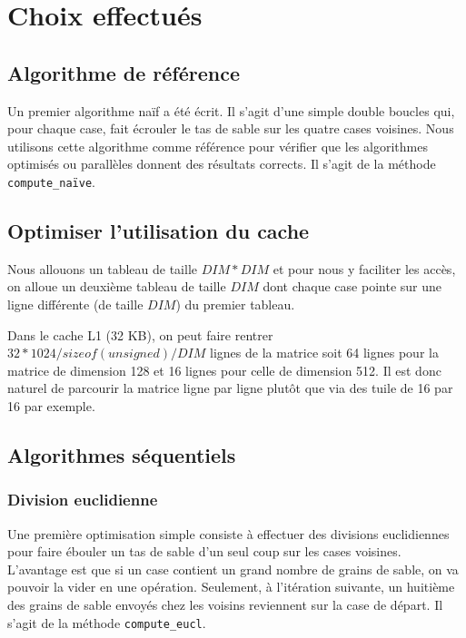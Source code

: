 \section {Choix effectués}

\subsection{Algorithme de référence}

Un premier algorithme naïf a été écrit. Il s'agit d'une simple double
boucles qui, pour chaque case, fait écrouler le tas de sable sur les
quatre cases voisines.  Nous utilisons cette algorithme comme
référence pour vérifier que les algorithmes optimisés ou parallèles
donnent des résultats corrects. Il s'agit de la méthode
\texttt{compute\_naïve}.
\medskip

\subsection{Optimiser l'utilisation du cache}
\label{sec:cache}

Nous allouons un tableau de taille $DIM*DIM$ et pour nous y faciliter les
accès, on alloue un deuxième tableau de taille $DIM$ dont chaque case
pointe sur une ligne différente (de taille $DIM$) du premier tableau.

Dans le cache L1 (32 KB), on peut faire rentrer
$32*1024/sizeof(unsigned)/DIM$ lignes de la matrice soit 64 lignes
pour la matrice de dimension 128 et 16 lignes pour celle de dimension
512. Il est donc naturel de parcourir la matrice ligne par ligne
plutôt que via des tuile de 16 par 16 par exemple.

\subsection{Algorithmes séquentiels}

\subsubsection{Division euclidienne}

Une première optimisation simple consiste à effectuer des divisions
euclidiennes pour faire ébouler un tas de sable d'un seul coup sur les
cases voisines. L'avantage est que si un case contient un grand nombre
de grains de sable, on va pouvoir la vider en une
opération. Seulement, à l'itération suivante, un huitième des grains
de sable envoyés chez les voisins reviennent sur la case de départ.
Il s'agit de la méthode \texttt{compute\_eucl}.
\medskip

